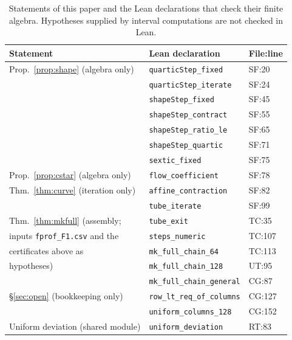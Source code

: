 \documentclass[11pt,a4paper]{article}
\theoremstyle{definition}
\theoremstyle{remark}
\newcommand{\code}[1]{\texttt{#1}}
\begin{document}
\begin{table}[ht]\centering\small
\begin{tabular}{lll}
\toprule
Statement & Lean declaration & File:line \\
\midrule
Prop.~\ref{prop:shape} (algebra only) & \code{quarticStep\_fixed} & SF:20 \\
 & \code{quarticStep\_iterate} & SF:24 \\
 & \code{shapeStep\_fixed} & SF:45 \\
 & \code{shapeStep\_contract} & SF:55 \\
 & \code{shapeStep\_ratio\_le} & SF:65 \\
 & \code{shapeStep\_quartic} & SF:71 \\
 & \code{sextic\_fixed} & SF:75 \\
Prop.~\ref{prop:cstar} (algebra only) & \code{flow\_coefficient} & SF:78 \\
Thm.~\ref{thm:curve} (iteration only) & \code{affine\_contraction} & SF:82 \\
 & \code{tube\_iterate} & SF:99 \\
Thm.~\ref{thm:mkfull} (assembly; & \code{tube\_exit} & TC:35 \\
\quad inputs \code{fprof\_F1.csv} and the & \code{steps\_numeric} & TC:107 \\
\quad certificates above as & \code{mk\_full\_chain\_64} & TC:113 \\
\quad hypotheses) & \code{mk\_full\_chain\_128} & UT:95 \\
 & \code{mk\_full\_chain\_general} & CG:87 \\
\S\ref{sec:open} (bookkeeping only) & \code{row\_lt\_req\_of\_columns} & CG:127 \\
 & \code{uniform\_columns\_128} & CG:152 \\
Uniform deviation (shared module) & \code{uniform\_deviation} & RT:83 \\
\bottomrule
\end{tabular}
\caption{Statements of this paper and the Lean declarations that check their finite algebra. Hypotheses supplied by interval computations are not checked in Lean.}\label{tab:corr}
\end{table}
\end{document}
